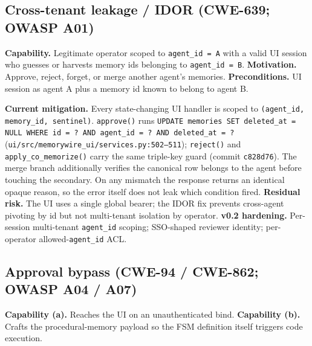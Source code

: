 \documentclass[11pt,letterpaper,twocolumn]{article}
\begin{document}
\subsection{Cross-tenant leakage / IDOR (CWE-639; OWASP A01)}
\label{sec:threats-idor}

\textbf{Capability.} Legitimate operator scoped to \texttt{agent\_id = A} with a valid UI session who guesses or harvests memory ids belonging to \texttt{agent\_id = B}. \textbf{Motivation.} Approve, reject, forget, or merge another agent's memories. \textbf{Preconditions.} UI session as agent A plus a memory id known to belong to agent B.

\textbf{Current mitigation.} Every state-changing UI handler is scoped to \texttt{(agent\_id, memory\_id, sentinel)}. \texttt{approve()} runs \texttt{UPDATE memories SET deleted\_at = NULL WHERE id = ? AND agent\_id = ? AND deleted\_at = ?} (\texttt{ui/src/memorywire\_ui/services.py:502--511}); \texttt{reject()} and \texttt{apply\_co\_memorize()} carry the same triple-key guard (commit \texttt{c828d76}). The merge branch additionally verifies the canonical row belongs to the agent before touching the secondary. On any mismatch the response returns an identical opaque reason, so the error itself does not leak which condition fired. \textbf{Residual risk.} The UI uses a single global bearer; the IDOR fix prevents cross-agent pivoting by id but not multi-tenant isolation by operator. \textbf{v0.2 hardening.} Per-session multi-tenant \texttt{agent\_id} scoping; SSO-shaped reviewer identity; per-operator allowed-\texttt{agent\_id} ACL.

\subsection{Approval bypass (CWE-94 / CWE-862; OWASP A04 / A07)}
\label{sec:threats-bypass}

\textbf{Capability (a).} Reaches the UI on an unauthenticated bind. \textbf{Capability (b).} Crafts the procedural-memory payload so the FSM definition itself triggers code execution.
\end{document}
